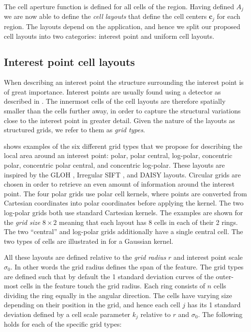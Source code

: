 \documentclass[thesis.tex]{subfiles}
\def\c{\mathbf{c}}
\begin{document}
The cell aperture function is defined for all cells of the region. Having defined $A_j$ we are now able to define the \emph{cell layouts} that define the cell centers $\c_j$ for each region. The layouts depend on the application, and hence we split our proposed cell layouts into two categories: interest point and uniform cell layouts.

\subsection{Interest point cell layouts}
\label{sec:cellApertureFunctionPoint}
When describing an interest point the structure surrounding the interest point is of great importance. Interest points are usually found using a detector as described in . The innermost cells of the cell layouts are therefore spatially smaller than the cells further away, in order to capture the structural variations close to the interest point in greater detail. Given the nature of the layouts as structured grids, we refer to them as \emph{grid types}.

 shows examples of the six different grid types that we propose for describing the local area around an interest point: polar, polar central, log-polar, concentric polar, concentric polar central, and concentric log-polar. These layouts are inspired by the GLOH \cite{mikolajczyk2005performance}, Irregular SIFT \cite{cui2009scale}, and DAISY \cite{tola2008fast} layouts. Circular grids are chosen in order to retrieve an even amount of information around the interest point. The four polar grids use polar cell kernels, where points are converted from Cartesian coordinates into polar coordinates before applying the kernel. The two log-polar grids both use standard Cartesian kernels. The examples are shown for the \emph{grid size} $8 \times 2$ meaning that each layout has 8 cells in each of their 2 rings. The two ``central'' and log-polar grids additionally have a single central cell. The two types of cells are illustrated in  for a Gaussian kernel.

All these layouts are defined relative to the \emph{grid radius} $r$ and interest point scale $\sigma_0$. In other words the grid radius defines the span of the feature. The grid types are defined such that by default the 1 standard deviation curves of the outer-most cells in the feature touch the grid radius. Each ring consists of $n$ cells dividing the ring equally in the angular direction. The cells have varying size depending on their position in the grid, and hence each cell $j$ has its 1 standard deviation defined by a cell scale parameter $k_j$ relative to $r$ and $\sigma_0$. The following holds for each of the specific grid types:
\end{document}
